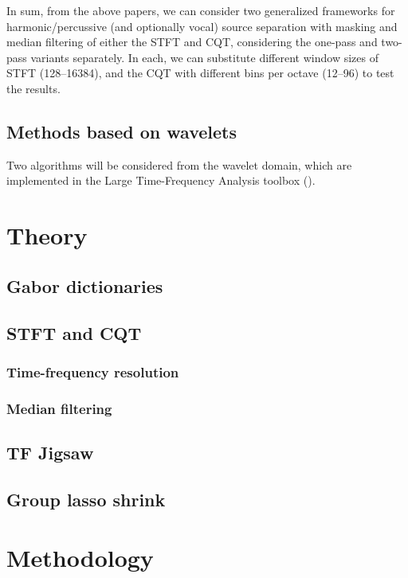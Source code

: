 \documentclass[10pt,letter]{article}
\begin{document}
In sum, from the above papers, we can consider two generalized frameworks for harmonic/percussive (and optionally vocal) source separation with masking and median filtering of either the STFT and CQT, considering the one-pass and two-pass variants separately. In each, we can substitute different window sizes of STFT (128--16384), and the CQT with different bins per octave (12--96) to test the results.

\subsection{Methods based on wavelets}

Two algorithms will be considered from the wavelet domain, which are implemented in the Large Time-Frequency Analysis toolbox (\cite{ltfat}).

\section{Theory}
\label{sec:theory}

\subsection{Gabor dictionaries}

\subsection{STFT and CQT}

\subsubsection{Time-frequency resolution}

\subsubsection{Median filtering}

\subsection{TF Jigsaw}

\subsection{Group lasso shrink}

\section{Methodology}
\label{sec:methodology}
\end{document}
